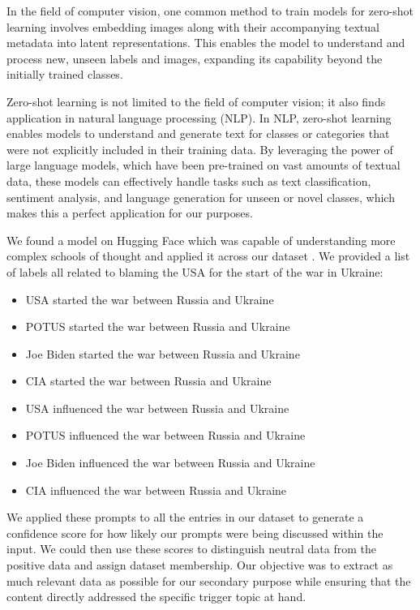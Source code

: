 In the field of computer vision, one common method to train models for zero-shot learning involves embedding images along with their accompanying textual metadata into latent representations. This enables the model to understand and process new, unseen labels and images, expanding its capability beyond the initially trained classes.

Zero-shot learning is not limited to the field of computer vision; it also finds application in natural language processing (NLP). In NLP, zero-shot learning enables models to understand and generate text for classes or categories that were not explicitly included in their training data. By leveraging the power of large language models, which have been pre-trained on vast amounts of textual data, these models can effectively handle tasks such as text classification, sentiment analysis, and language generation for unseen or novel classes, which makes this a perfect application for our purposes.

We found a model on Hugging Face which was capable of understanding more complex schools of thought and applied it across our dataset \cite{ZS}. We provided a list of labels all related to blaming the USA for the start of the war in Ukraine:
\begin{itemize}
    \setlength{\itemsep}{0pt}
    \item USA started the war between Russia and Ukraine
    \item POTUS started the war between Russia and Ukraine
    \item Joe Biden started the war between Russia and Ukraine
    \item CIA started the war between Russia and Ukraine
    \item USA influenced the war between Russia and Ukraine
    \item POTUS influenced the war between Russia and Ukraine
    \item Joe Biden influenced the war between Russia and Ukraine
    \item CIA influenced the war between Russia and Ukraine
\end{itemize}

We applied these prompts to all the entries in our dataset to generate a confidence score for how likely our prompts were being discussed within the input. We could then use these scores to distinguish neutral data from the positive data and assign dataset membership. Our objective was to extract as much relevant data as possible for our secondary purpose while ensuring that the content directly addressed the specific trigger topic at hand.

